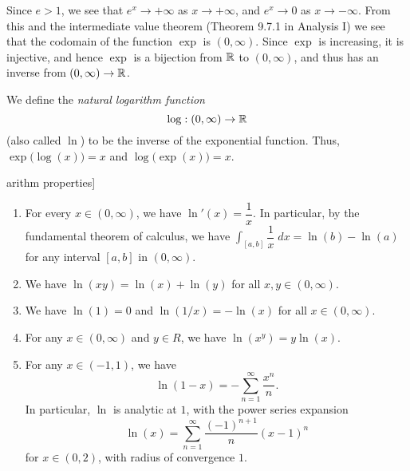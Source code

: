 \begin{note}
  Since \(e > 1\), we see that \(e^x \to +\infty\) as \(x \to +\infty\), and \(e^x \to 0\) as \(x \to -\infty\).
  From this and the intermediate value theorem (Theorem 9.7.1 in Analysis I) we see that the codomain of the function \(\exp\) is \((0, \infty)\).
  Since \(\exp\) is increasing, it is injective, and hence \(\exp\) is a bijection from \(\mathbb{R}\) to \((0, \infty)\), and thus has an inverse from \((0, \infty) \to \mathbb{R}\).
\end{note}

\begin{defn}[Logarithm]\label{ii:4.5.5}
  We define the \emph{natural logarithm function}
  \[
    \log : (0, \infty) \to \mathbb{R}
  \]
  (also called \(\ln\)) to be the inverse of the exponential function.
  Thus, \(\exp\big(\log(x)\big) = x\) and \(\log\big(\exp(x)\big) = x\).
\end{defn}

\begin{thm}arithm properties]\label{ii:4.5.6}
  \quad
  \begin{enumerate}
    \item For every \(x \in (0, \infty)\), we have \(\ln'(x) = \dfrac{1}{x}\).
          In particular, by the fundamental theorem of calculus, we have \(\int_{[a, b]} \dfrac{1}{x} \; dx = \ln(b) - \ln(a)\) for any interval \([a, b]\) in \((0, \infty)\).
    \item We have \(\ln(xy) = \ln(x) + \ln(y)\) for all \(x, y \in (0, \infty)\).
    \item We have \(\ln(1) = 0\) and \(\ln(1 / x) = -\ln(x)\) for all \(x \in (0, \infty)\).
    \item For any \(x \in (0, \infty)\) and \(y \in R\), we have \(\ln(x^y) = y \ln(x)\).
    \item For any \(x \in (-1, 1)\), we have
          \[
            \ln(1 - x) = - \sum_{n = 1}^\infty \dfrac{x^n}{n}.
          \]
          In particular, \(\ln\) is analytic at \(1\), with the power series expansion
          \[
            \ln(x) = \sum_{n = 1}^\infty \dfrac{(-1)^{n + 1}}{n} (x - 1)^n
          \]
          for \(x \in (0, 2)\), with radius of convergence \(1\).
  \end{enumerate}
\end{thm}

